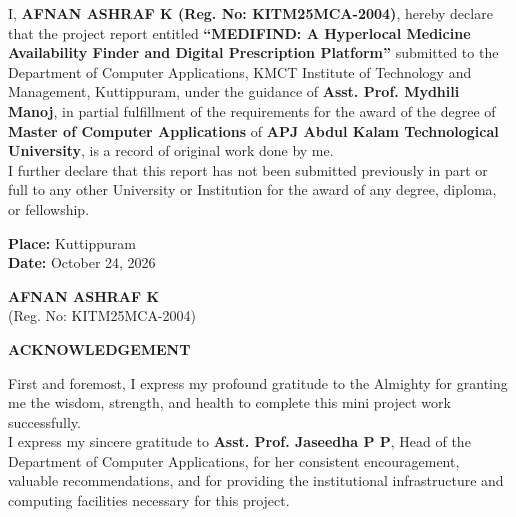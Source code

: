 \documentclass[12pt,a4paper]{report}
\begin{document}
\noindent I, \textbf{AFNAN ASHRAF K (Reg. No: KITM25MCA-2004)}, hereby declare that the project report entitled \textbf{``MEDIFIND: A Hyperlocal Medicine Availability Finder and Digital Prescription Platform''} submitted to the Department of Computer Applications, KMCT Institute of Technology and Management, Kuttippuram, under the guidance of \textbf{Asst. Prof. Mydhili Manoj}, in partial fulfillment of the requirements for the award of the degree of \textbf{Master of Computer Applications} of \textbf{APJ Abdul Kalam Technological University}, is a record of original work done by me.\\[0.5cm]

\noindent I further declare that this report has not been submitted previously in part or full to any other University or Institution for the award of any degree, diploma, or fellowship.\\[2.5cm]

\noindent
\begin{minipage}[t]{0.48\textwidth}
    \textbf{Place:} Kuttippuram\\[0.2cm]
    \textbf{Date:} October 24, 2026
\end{minipage}
\hfill
\begin{minipage}[t]{0.48\textwidth}
    \raggedleft
    \textbf{AFNAN ASHRAF K}\\
    (Reg. No: KITM25MCA-2004)
\end{minipage}

\newpage
\thispagestyle{plain}
\begin{center}
    {\Large \textbf{ACKNOWLEDGEMENT}}\\[1.0cm]
\end{center}

\noindent First and foremost, I express my profound gratitude to the Almighty for granting me the wisdom, strength, and health to complete this mini project work successfully.\\[0.5cm]

\noindent I express my sincere gratitude to \textbf{Asst. Prof. Jaseedha P P}, Head of the Department of Computer Applications, for her consistent encouragement, valuable recommendations, and for providing the institutional infrastructure and computing facilities necessary for this project.\\[0.5cm]
\end{document}
